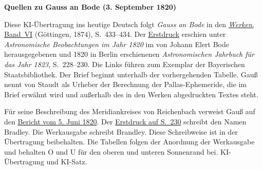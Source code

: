 \clearpage\thispagestyle{empty}
\begin{center}\textbf{Quellen zu Gauss an Bode (3. September 1820)}\end{center}
\noindent Diese KI-Übertragung ins heutige Deutsch folgt \textit{Gauss an Bode} in den \href{https://gdz.sub.uni-goettingen.de/id/PPN236007467}{\textit{Werken}, Band~VI} (Göttingen, 1874), S.~433--434. Der \href{https://api.digitale-sammlungen.de/iiif/image/v2/bsb10538352_00234/full/1600,/0/default.jpg}{Erstdruck} erschien unter \textit{Astronomische Beobachtungen im Jahr 1820} im von Johann Elert Bode herausgegebenen und 1820 in Berlin erschienenen \textit{Astronomischen Jahrbuch für das Jahr 1823}, S.~228--230. Die Links führen zum Exemplar der Bayerischen Staatsbibliothek. Der Brief beginnt unterhalb der vorhergehenden Tabelle. Gauß nennt von Staudt als Urheber der Berechnung der Pallas-Ephemeride, die im Brief erwähnt wird und außerhalb des in den Werken abgedruckten Textes steht.
\par\smallskip\noindent Für seine Beschreibung des Meridiankreises von Reichenbach verweist Gauß auf den \hyperlink{native-434-part-lower}{Bericht vom 5. Juni 1820}. Der \href{https://api.digitale-sammlungen.de/iiif/image/v2/bsb10538352_00236/full/1600,/0/default.jpg}{Erstdruck auf S.~230} schreibt den Namen Bradley. Die Werkausgabe schreibt Brandley. Diese Schreibweise ist in der Übertragung beibehalten. Die Tabellen folgen der Anordnung der Werkausgabe und behalten O und U für den oberen und unteren Sonnenrand bei. KI-Übertragung und KI-Satz.
\clearpage
